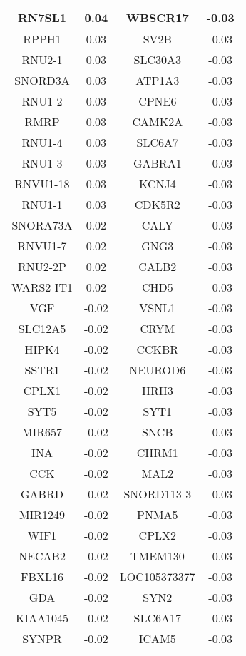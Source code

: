 \begin{longtable}{|c|c||c|c|}
		RN7SL1 & 0.04 & WBSCR17 & -0.03 \\
		\hline
		RPPH1 & 0.03 & SV2B & -0.03 \\
		\hline
		RNU2-1 & 0.03 & SLC30A3 & -0.03 \\
		\hline
		SNORD3A & 0.03 & ATP1A3 & -0.03 \\
		\hline
		RNU1-2 & 0.03 & CPNE6 & -0.03 \\
		\hline
		RMRP & 0.03 & CAMK2A & -0.03 \\
		\hline
		RNU1-4 & 0.03 & SLC6A7 & -0.03 \\
		\hline
		RNU1-3 & 0.03 & GABRA1 & -0.03 \\
		\hline
		RNVU1-18 & 0.03 & KCNJ4 & -0.03 \\
		\hline
		RNU1-1 & 0.03 & CDK5R2 & -0.03 \\
		\hline
		SNORA73A & 0.02 & CALY & -0.03 \\
		\hline
		RNVU1-7 & 0.02 & GNG3 & -0.03 \\
		\hline
		RNU2-2P & 0.02 & CALB2 & -0.03 \\
		\hline
		WARS2-IT1 & 0.02 & CHD5 & -0.03 \\
		\hline
		VGF & -0.02 & VSNL1 & -0.03 \\
		\hline
		SLC12A5 & -0.02 & CRYM & -0.03 \\
		\hline
		HIPK4 & -0.02 & CCKBR & -0.03 \\
		\hline
		SSTR1 & -0.02 & NEUROD6 & -0.03 \\
		\hline
		CPLX1 & -0.02 & HRH3 & -0.03 \\
		\hline
		SYT5 & -0.02 & SYT1 & -0.03 \\
		\hline
		MIR657 & -0.02 & SNCB & -0.03 \\
		\hline
		INA & -0.02 & CHRM1 & -0.03 \\
		\hline
		CCK & -0.02 & MAL2 & -0.03 \\
		\hline
		GABRD & -0.02 & SNORD113-3 & -0.03 \\
		\hline
		MIR1249 & -0.02 & PNMA5 & -0.03 \\
		\hline
		WIF1 & -0.02 & CPLX2 & -0.03 \\
		\hline
		NECAB2 & -0.02 & TMEM130 & -0.03 \\
		\hline
		FBXL16 & -0.02 & LOC105373377 & -0.03 \\
		\hline
		GDA & -0.02 & SYN2 & -0.03 \\
		\hline
		KIAA1045 & -0.02 & SLC6A17 & -0.03 \\
		\hline
		SYNPR & -0.02 & ICAM5 & -0.03 \\

\end{longtable}
